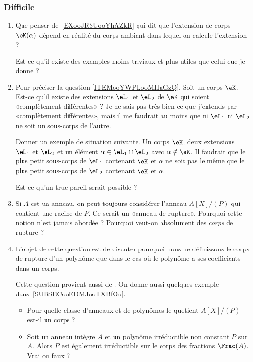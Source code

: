 \subsubsection{Difficile}

\begin{enumerate}
    \item   \label{ITEMooYWPLooMHuGzQ}
        Que penser de~\ref{EXooJRSUooYhAZkR} qui dit que l'extension de corps \( \eK(\alpha)\) dépend en réalité du corps ambiant dans lequel on calcule l'extension ?

        Est-ce qu'il existe des exemples moins triviaux et plus utiles que celui que je donne ?
    \item
        Pour préciser la question \ref{ITEMooYWPLooMHuGzQ}. Soit un corps \( \eK\). Est-ce qu'il existe des extensions \( \eL_1\) et \( \eL_2\) de \( \eK\) qui soient «complètement différentes» ? Je ne sais pas très bien ce que j'entends par «complètement différentes», mais il me faudrait au moins que ni \( \eL_1\) ni \( \eL_2\) ne soit un sous-corps de l'autre.

        Donner un exemple de situation suivante. Un corps \( \eK\), deux extensions \( \eL_1\) et \( \eL_2\) et un élément \( \alpha\in \eL_1\cap \eL_2\) avec \( \alpha\notin \eK\). Il faudrait que le plus petit sous-corps de \( \eL_1\) contenant \( \eK\) et \( \alpha\) ne soit pas le même que le plus petit sous-corps de \( \eL_2\) contenant \( \eK\) et \( \alpha\).

        Est-ce qu'un truc pareil serait possible ?
    \item
        Si \( A\) est un anneau, on peut toujours considérer l'anneau \( A[X]/(P)\) qui contient une racine de \( P\). Ce serait un «anneau de rupture». Pourquoi cette notion n'est jamais abordée ? Pourquoi veut-on absolument des \emph{corps} de rupture ?
    \item       \label{ITEMooUBZIooDDcfWg}
        L'objet de cette question est de discuter pourquoi nous ne définissons le corps de rupture d'un polynôme que dans le cas où le polynôme a ses coefficients dans un corps.

        Cette question provient aussi de \cite{ooEEWJooZvNYpA}. On donne aussi quelques exemple dans~\ref{SUBSECooEDMJooTXBfOu}.

        \begin{itemize}
            \item
        Pour quelle classe d'anneaux et de polynômes le quotient \( A[X]/(P)\) est-il un corps ?
    \item
        Soit un anneau intègre \( A\) et un polynôme irréductible non constant \( P\) sur \( A\). Alors \( P\) est également irréductible sur le corps des fractions \( \Frac(A)\). Vrai ou faux ?
        \end{itemize}
\end{enumerate}

